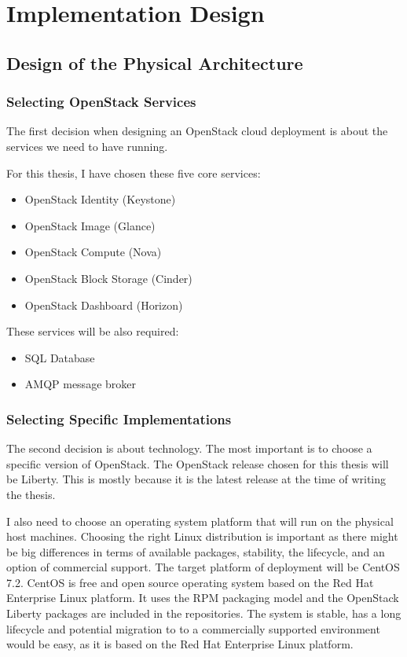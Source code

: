 \chapter{Implementation Design}
\label{ch:implementation}

\section{Design of the Physical Architecture}
\label{sec:phys}

\subsection{Selecting OpenStack Services}
The first decision when designing an OpenStack cloud deployment is about the services we need to have running.

For this thesis, I have chosen these five core services:
\begin{itemize}
  \item{OpenStack Identity (Keystone)}
  \item{OpenStack Image (Glance)}
  \item{OpenStack Compute (Nova)}
  \item{OpenStack Block Storage (Cinder)}
  \item{OpenStack Dashboard (Horizon)}
\end{itemize}

These services will be also required:
\begin{itemize}
  \item{SQL Database}
  \item{AMQP message broker}
\end{itemize}



\subsection{Selecting Specific Implementations}
The second decision is about technology. The most important is to choose a specific version of OpenStack. The OpenStack release chosen for this thesis will be Liberty. This is mostly because it is the  latest release at the time of writing the thesis.

I also need to choose an operating system platform that will run on the physical host machines. Choosing the right Linux distribution is important as there might be big differences in terms of available packages, stability, the lifecycle, and an option of commercial support. The target platform of deployment will be CentOS 7.2. CentOS is free and open source operating system based on the Red Hat Enterprise Linux platform. It uses the RPM packaging model and the OpenStack Liberty packages are included in the repositories. The system is stable, has a long lifecycle and potential migration to to a commercially supported environment would be easy, as it is based on the Red Hat Enterprise Linux platform.

